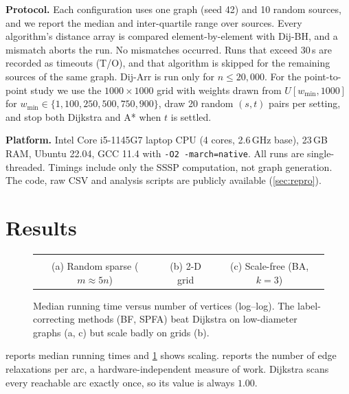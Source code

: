 \documentclass[conference]{IEEEtran}
\begin{document}
\textbf{Protocol.} Each configuration uses one graph (seed 42) and 10 random
sources, and we report the median and inter-quartile range over sources. Every
algorithm's distance array is compared element-by-element with Dij-BH, and a
mismatch aborts the run. No mismatches occurred. Runs that exceed 30\,s are
recorded as timeouts (T/O), and that algorithm is skipped for the remaining
sources of the same graph. Dij-Arr is run only for $n\le 20{,}000$.
For the point-to-point study we use the $1000\times1000$ grid with weights
drawn from $U[w_{\min},1000]$ for $w_{\min}\in\{1,100,250,500,750,900\}$, draw 20
random $(s,t)$ pairs per setting, and stop both Dijkstra and A* when $t$ is
settled.

\textbf{Platform.} Intel Core i5-1145G7 laptop CPU (4 cores, 2.6\,GHz base), 23\,GB RAM,
Ubuntu 22.04, GCC 11.4 with \texttt{-O2 -march=native}. All runs are
single-threaded.
Timings include only the SSSP computation, not graph generation. The code, raw
CSV and analysis scripts are publicly available (\cref{sec:repro}).

\section{Results}
\label{sec:results}

\begin{table}[t]
\centering
\caption{Median SSSP time in milliseconds over 10 sources (lower is better; best per row in bold). T/O: timeout; --: not run ($n>20{,}000$ for Dij-Arr).}
\label{tab:main}
\footnotesize

\end{table}

\begin{figure}[t]
\centering
\begin{tabular}{ccc}
 &
 &
 \\
(a) Random sparse ($m\approx5n$) & (b) 2-D grid & (c) Scale-free (BA, $k=3$)
\end{tabular}
\caption{Median running time versus number of vertices (log--log). The label-correcting methods (BF, SPFA) beat Dijkstra on low-diameter graphs (a, c) but scale badly on grids (b).}
\label{fig:scaling}
\end{figure}

 reports median running times and \cref{fig:scaling} shows
scaling.  reports the number of edge relaxations per arc, a
hardware-independent measure of work. Dijkstra scans every reachable arc exactly
once, so its value is always $1.00$.
\end{document}
